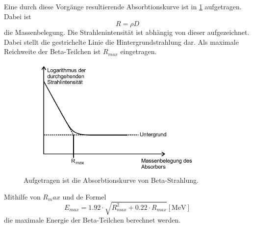 Eine durch diese Vorgänge resultierende Absorbtionskurve ist in \ref{fig:Beta2} aufgetragen.
Dabei ist 
\begin{equation}
    R=\rho D
    \label{eqn:Massenbelegung}
\end{equation}
die Massenbelegung.
Die Strahlenintensität ist abhängig von dieser aufgezeichnet.
Dabei stellt die gestrichelte Linie die Hintergrundstrahlung dar.
Als maximale Reichweite der Beta-Teilchen ist $R_{max}$ eingetragen.
\begin{figure}[H]
    \centering
    \includegraphics[width=10cm]{Bilder/Beta2.png}
    \caption{Aufgetragen ist die Absorbtionskurve von Beta-Strahlung.}
    \label{fig:Beta2}
\end{figure}
Mithilfe von $R_max$ und de Formel 
\begin{equation}
    E_{max}=1.92 \cdot \sqrt{R_{max}^2+0.22 \cdot R_{max}} [\unit{\mega\electronvolt}]
    \label{eqn:MaxEnergie}
\end{equation}
die maximale Energie der Beta-Teilchen berechnet werden.

\cite{V704}
